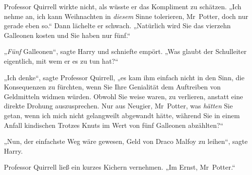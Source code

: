Professor Quirrell wirkte nicht, als wüsste er das Kompliment zu schätzen. „Ich nehme an, ich kann Weihnachten in \emph{diesem} Sinne tolerieren, Mr~Potter, doch nur gerade eben so.“ Dann lächelte er schwach. „Natürlich wird Sie das vierzehn Galleonen kosten und Sie haben nur fünf.“

„\emph{Fünf} Galleonen“, sagte Harry und schniefte empört. „Was glaubt der Schulleiter eigentlich, mit wem er es zu tun hat?“

„Ich denke“, sagte Professor Quirrell, „es kam ihm einfach nicht in den Sinn, die Konsequenzen zu fürchten, wenn Sie Ihre Genialität dem Auftreiben von Geldmitteln widmen würden. Obwohl Sie weise waren, zu verlieren, anstatt eine direkte Drohung auszusprechen. Nur aus Neugier, Mr~Potter, was \emph{hätten} Sie getan, wenn ich mich nicht gelangweilt abgewandt hätte, während Sie in einem Anfall kindischen Trotzes Knuts im Wert von fünf Galleonen abzählten?“

„Nun, der einfachste Weg wäre gewesen, Geld von Draco Malfoy zu leihen“, sagte Harry.

Professor Quirrell ließ ein kurzes Kichern vernehmen. „Im Ernst, Mr~Potter.“

